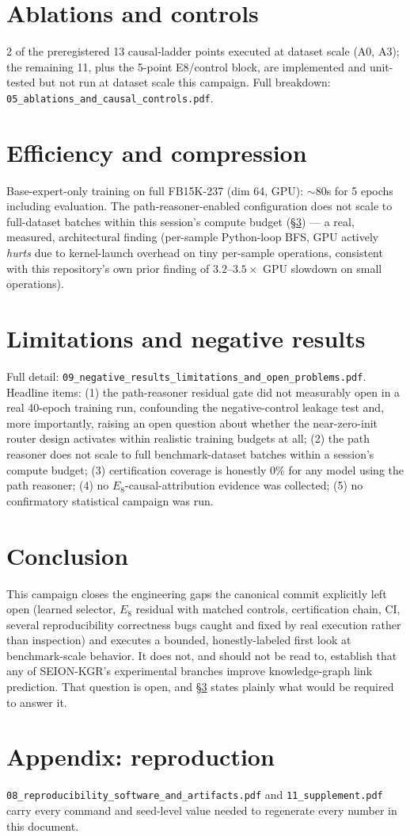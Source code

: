 \documentclass[11pt]{article}
\begin{document}
\section{Ablations and controls}
\label{sec:ablations}
2 of the preregistered 13 causal-ladder points executed at dataset scale (A0, A3); the remaining
11, plus the 5-point E8/control block, are implemented and unit-tested but not run at dataset
scale this campaign. Full breakdown: \texttt{05\_ablations\_and\_causal\_controls.pdf}.

\section{Efficiency and compression}
Base-expert-only training on full FB15K-237 (dim 64, GPU): $\sim$80s for 5 epochs including
evaluation. The path-reasoner-enabled configuration does not scale to full-dataset batches within
this session's compute budget (\S\ref{sec:limits}) --- a real, measured, architectural finding
(per-sample Python-loop BFS, GPU actively \emph{hurts} due to kernel-launch overhead on tiny
per-sample operations, consistent with this repository's own prior finding of $3.2$--$3.5\times$
GPU slowdown on small operations).

\section{Limitations and negative results}
\label{sec:limits}
Full detail: \texttt{09\_negative\_results\_limitations\_and\_open\_problems.pdf}. Headline items:
(1) the path-reasoner residual gate did not measurably open in a real 40-epoch training run,
confounding the negative-control leakage test and, more importantly, raising an open question about
whether the near-zero-init router design activates within realistic training budgets at all; (2)
the path reasoner does not scale to full benchmark-dataset batches within a session's compute
budget; (3) certification coverage is honestly $0\%$ for any model using the path reasoner; (4) no
$E_8$-causal-attribution evidence was collected; (5) no confirmatory statistical campaign was run.

\section{Conclusion}
This campaign closes the engineering gaps the canonical commit explicitly left open (learned
selector, $E_8$ residual with matched controls, certification chain, CI, several reproducibility
correctness bugs caught and fixed by real execution rather than inspection) and executes a bounded,
honestly-labeled first look at benchmark-scale behavior. It does not, and should not be read to,
establish that any of SEION-KGR's experimental branches improve knowledge-graph link prediction.
That question is open, and \S\ref{sec:limits} states plainly what would be required to answer it.

\appendix
\section{Appendix: reproduction}
\texttt{08\_reproducibility\_software\_and\_artifacts.pdf} and \texttt{11\_supplement.pdf} carry
every command and seed-level value needed to regenerate every number in this document.
\end{document}
